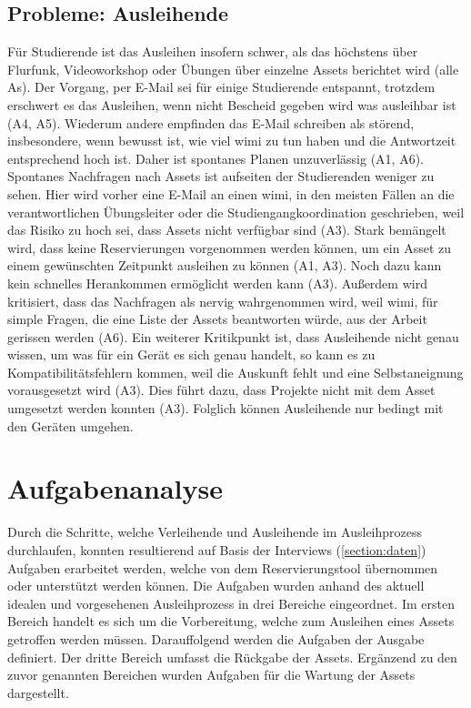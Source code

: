 \subsection{Probleme: Ausleihende}
\label{section:probleme-Ausleihende}
Für Studierende ist das Ausleihen insofern schwer, als das höchstens über Flurfunk, Videoworkshop
oder Übungen über einzelne Assets berichtet wird (alle As). Der Vorgang, per E-Mail sei für einige
Studierende entspannt, trotzdem erschwert es das Ausleihen, wenn nicht Bescheid gegeben wird was
ausleihbar ist (A4, A5). Wiederum andere empfinden das E-Mail schreiben als störend, insbesondere,
wenn bewusst ist, wie viel \ac{wimi} zu tun haben und die Antwortzeit entsprechend hoch ist. Daher
ist spontanes Planen unzuverlässig (A1, A6). Spontanes Nachfragen nach Assets ist aufseiten der
Studierenden weniger zu sehen. Hier wird vorher eine E-Mail an einen \ac{wimi}, in den meisten
Fällen an die verantwortlichen Übungsleiter oder die Studiengangkoordination geschrieben, weil das
Risiko zu hoch sei, dass Assets nicht verfügbar sind (A3). Stark bemängelt wird, dass keine
Reservierungen vorgenommen werden können, um ein Asset zu einem gewünschten Zeitpunkt ausleihen zu
können (A1, A3). Noch dazu kann kein schnelles Herankommen ermöglicht werden kann (A3). Außerdem
wird kritisiert, dass das Nachfragen als nervig wahrgenommen wird, weil \ac{wimi}, für simple
Fragen, die eine Liste der Assets beantworten würde, aus der Arbeit gerissen werden (A6). Ein
weiterer Kritikpunkt ist, dass Ausleihende nicht genau wissen, um was für ein Gerät es sich genau
handelt, so kann es zu Kompatibilitätsfehlern kommen, weil die Auskunft fehlt und eine
Selbstaneignung vorausgesetzt wird (A3). Dies führt dazu, dass Projekte nicht mit dem Asset umgesetzt
werden konnten (A3). Folglich können Ausleihende nur bedingt mit den Geräten umgehen.


\section{Aufgabenanalyse}
\label{section:aufgaben}
Durch die Schritte, welche Verleihende und Ausleihende im Ausleihprozess durchlaufen, konnten
resultierend auf Basis der Interviews (\ref{section:daten}) Aufgaben erarbeitet werden, welche von
dem Reservierungstool übernommen oder unterstützt werden können. Die Aufgaben wurden anhand des
aktuell idealen und vorgesehenen Ausleihprozess in drei Bereiche eingeordnet. Im ersten Bereich
handelt es sich um die Vorbereitung, welche zum Ausleihen eines Assets getroffen werden müssen.
Darauffolgend werden die Aufgaben der Ausgabe definiert. Der dritte Bereich umfasst die Rückgabe der
Assets. Ergänzend zu den zuvor genannten Bereichen wurden Aufgaben für die Wartung der Assets
dargestellt.

